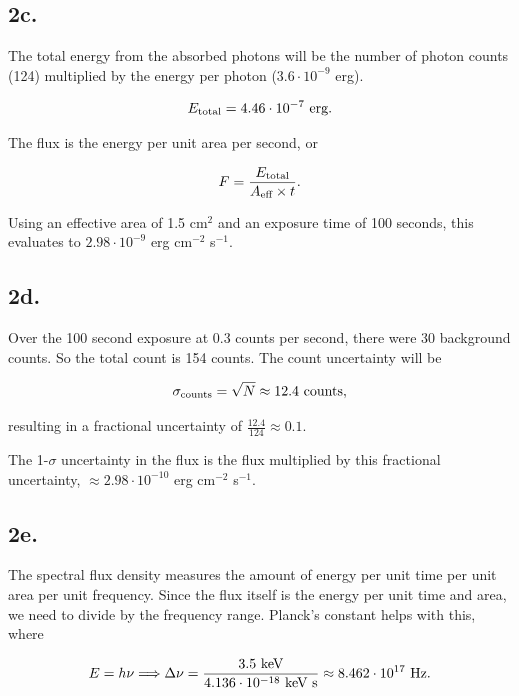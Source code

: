 \documentclass{article}
\begin{document}
\subsection*{2c.}
The total energy from the absorbed photons will be the number of photon counts (124) multiplied by the energy per photon ($3.6\cdot10^{-9}$ erg).

\begin{equation*}
    E_\textup{total}=4.46\cdot10^{-7}\textup{ erg}.
\end{equation*}

The flux is the energy per unit area per second, or

\begin{equation}
    F=\frac{E_\textup{total}}{A_\textup{eff}\times t}.
\end{equation}

Using an effective area of 1.5 cm$^2$ and an exposure time of 100 seconds, this evaluates to $2.98\cdot10^{-9}$ erg cm$^{-2}$ s$^{-1}$.

\subsection*{2d.}
Over the 100 second exposure at 0.3 counts per second, there were 30 background counts. So the total count is 154 counts. The count uncertainty will be

\begin{equation*}
\sigma_\textup{counts}=\sqrt{N}\approx12.4\textup{ counts},
\end{equation*}

resulting in a fractional uncertainty of $\frac{12.4}{124}\approx0.1$.

The 1-$\sigma$ uncertainty in the flux is the flux multiplied by this fractional uncertainty, $\approx2.98\cdot10^{-10}$ erg cm$^{-2}$ s$^{-1}$.

\subsection*{2e.}
The spectral flux density measures the amount of energy per unit time per unit area per unit frequency. Since the flux itself is the energy per unit time and area, we need to divide by the frequency range. Planck's constant helps with this, where

\begin{equation*}
    E=h\nu\Longrightarrow\Delta\nu = \frac{3.5\textup{ keV}}{4.136\cdot10^{-18}\textup{ keV s}}\approx8.462\cdot10^{17}\textup{ Hz}.
\end{equation*}
\end{document}
